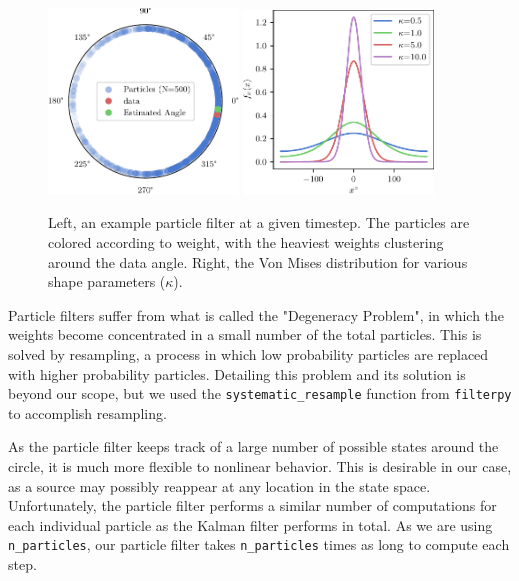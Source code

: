 \documentclass[11pt]{amsart}
\begin{document}
\begin{figure}[htp]
    \centering
    \includegraphics[width=0.45\textwidth]{actual_paper_graphs/particle_filter_example.pdf}\hfill
    \includegraphics[width=0.45\textwidth]{actual_paper_graphs/von_mises_pdf.pdf}\hfill
    \caption{Left, an example particle filter at a given timestep. The particles are colored according to weight, with the heaviest weights clustering around the data angle. Right, the Von Mises distribution for various shape parameters ($\kappa$).}
    \label{fig:particle_filter_stuff}
\end{figure}

Particle filters suffer from what is called the "Degeneracy Problem", in which the weights become concentrated in a small number of the total particles. This is solved by resampling, a process in which low probability particles are replaced 
with higher probability particles. Detailing this problem and its solution is beyond our scope, but we used the \lstinline{systematic_resample} function from \lstinline{filterpy} to accomplish resampling.

As the particle filter keeps track of a large number of possible states around the circle, it is much more flexible to nonlinear behavior. This is desirable in our case, as a source may possibly reappear at any 
location in the state space. Unfortunately, the particle filter performs a similar number of computations for each individual particle as the Kalman filter performs in total. As we are using \lstinline{n_particles}, our particle filter takes \lstinline{n_particles} 
times as long to compute each step.
\end{document}
